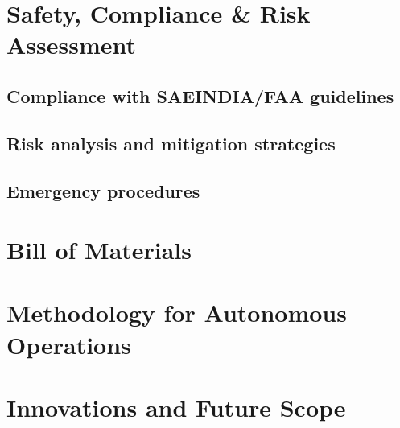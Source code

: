 \documentclass[12pt]{report}
\begin{document}
  \chapter{Safety, Compliance \& Risk Assessment}
    \section{Compliance with SAEINDIA/FAA guidelines}
    \section{Risk analysis and mitigation strategies}
    \section{Emergency procedures}
  
  \chapter{Bill of Materials}
  \chapter{Methodology for Autonomous Operations}
  \chapter{Innovations and Future Scope}
  
\end{document}
